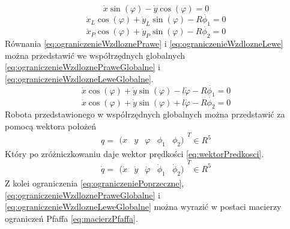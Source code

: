         \begin{equation}
            \dot{x}\sin(\varphi) - \dot{y}\cos(\varphi) = 0
            \label{eq:ograniczeniePoprzeczne}
        \end{equation}
        \begin{equation}
            \dot{x}_L\cos(\varphi) + \dot{y}_L\sin(\varphi) - R\dot{\phi_1} = 0
            \label{eq:ograniczenieWzdlozneLewe}
        \end{equation}
        \begin{equation}
            \dot{x}_P\cos(\varphi) + \dot{y}_P\sin(\varphi) - R\dot{\phi_2} = 0
            \label{eq:ograniczenieWzdloznePrawe}
        \end{equation}
        Równania \ref{eq:ograniczenieWzdloznePrawe} i \ref{eq:ograniczenieWzdlozneLewe} można przedstawić we współrzędnych globalnych \ref{eq:ograniczenieWzdloznePraweGlobalne} i \ref{eq:ograniczenieWzdlozneLeweGlobalne}.
        \begin{equation}
            \dot{x}\cos(\varphi) + \dot{y}\sin(\varphi) -l\dot{\varphi} - R\dot{\phi_1} = 0
            \label{eq:ograniczenieWzdloznePraweGlobalne}
        \end{equation}
        \begin{equation}
            \dot{x}\cos(\varphi) + \dot{y}\sin(\varphi) +l\dot{\varphi} - R\dot{\phi_2} = 0
            \label{eq:ograniczenieWzdlozneLeweGlobalne}
        \end{equation}
        Robota przedstawionego w współrzędnych globalnych można przedstawić za pomocą wektora położeń %
        \begin{equation*}
            q =
            \begin{matrix}
                 ( x & y & \varphi & \phi_1 & \phi_2)
            \end{matrix}
            ^T\in R^5
        \end{equation*}
        Który po zróżniczkowaniu daje wektor prędkości \ref{eq:wektorPredkosci}.
        \begin{equation}
            \dot{q} = 
            \begin{matrix}
                (\dot{x} & \dot{y} & \dot{\varphi} & \dot{\phi}_1 & \dot{\phi}_2)
            \end{matrix}
            ^T \in R^5
            \label{eq:wektorPredkosci}
        \end{equation}
        Z kolei ograniczenia \ref{eq:ograniczeniePoprzeczne}, \ref{eq:ograniczenieWzdloznePraweGlobalne} i \ref{eq:ograniczenieWzdlozneLeweGlobalne} można wyrazić w postaci macierzy ograniczeń Pfaffa \ref{eq:macierzPfaffa}.
